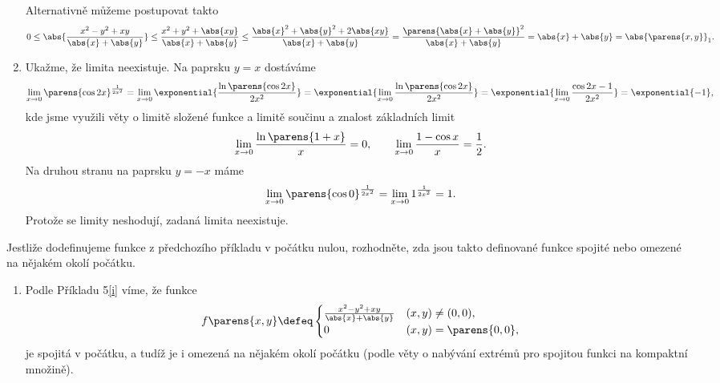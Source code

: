 \documentclass[answers]{exam}
\begin{document}
\begin{questions}
\begin{solution}
\begin{enumerate}[label=(\roman*)]
			Alternativně můžeme postupovat takto
			\begin{equation*}
				0
				\le
				\abs{\frac{x^2 - y^2 + xy}{\abs{x} + \abs{y}}}
				\le
				\frac{x^2 + y^2 + \abs{xy}}{\abs{x} + \abs{y}}
				\le
				\frac{\abs{x}^2 + \abs{y}^2 + 2 \abs{xy}}{\abs{x} + \abs{y}}
				=
				\frac{\parens{\abs{x} + \abs{y}}^2}{\abs{x} + \abs{y}}
				=
				\abs{x} + \abs{y}
				=
				{\abs{\parens{x, y}}}_{\mathrm{1}}.
			\end{equation*}			
		\item \label{ii}
			Ukažme, že limita neexistuje. Na paprsku $y = x$ dostáváme
			\begin{equation*}
				\lim_{x \to 0} \parens{\cos 2x}^{\frac{1}{2 x^2}}
				=
				\lim_{x \to 0} \exponential{\frac{\ln \parens{\cos 2x}}{2 x^2}}
				=
				\exponential{\lim_{x \to 0} \frac{\ln \parens{\cos 2x}}{2 x^2}}
				=
				\exponential{\lim_{x \to 0} \frac{\cos 2x - 1}{2x^2}}
				=
				\exponential{-1},
			\end{equation*}
			kde jsme využili věty o limitě složené funkce a limitě součinu a znalost základních limit
			\begin{equation*}
				\lim_{x \to 0} \frac{\ln \parens{1 + x}}{x} = 0,
				\qquad
				\lim_{x \to 0} \frac{1 - \cos x}{x} = \frac{1}{2}.
			\end{equation*}
			Na druhou stranu na paprsku $y = -x$ máme
			\begin{equation*}
				\lim_{x \to 0} \parens{\cos 0}^{\frac{1}{2 x^2}}
				=
				\lim_{x \to 0} 1^{\frac{1}{2 x^2}}
				=
				1.
			\end{equation*}
			Protože se limity neshodují, zadaná limita neexistuje.
	\end{enumerate}	
	\end{solution}
	
	\question
	Jestli\v ze dodefinujeme funkce z p\v redchoz\'iho p\v r\'ikladu v po\v c\'atku nulou, rozhodn\v ete, zda jsou takto definované funkce spojit\'e nebo omezen\'e na n\v ejak\'em okol\'i po\v c\'atku.
	
	\begin{solution}
		\begin{enumerate}[label=(\roman*)]
			\item
				Podle Příkladu 5\ref{i} víme, že funkce
				\begin{equation*}
					f\parens{x,y}
					\defeq
					\begin{cases}
						\frac{x^2 - y^2 + xy}{\abs{x} + \abs{y}} &(x, y) \neq (0, 0),
						\\
						0 &(x, y) = \parens{0, 0},
					\end{cases}
				\end{equation*}
				je spojitá v počátku, a tudíž je i omezená na nějakém okolí počátku (podle věty o nabývání extrémů pro spojitou funkci na kompaktní množině).
				

\end{enumerate}
\end{solution}
\end{questions}
\end{document}
